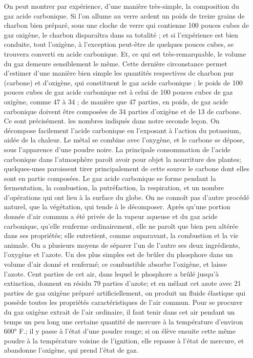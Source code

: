 On peut montrer par expérience, d'une manière très-simple, la composition du gaz acide carbonique. Si l'on allume au verre ardent un poids de treize grains de charbon bien préparé, sous une cloche de verre qui contienne 100 pouces cubes de gaz oxigène, le charbon disparaîtra dans sa totalité ; et si l'expérience est bien conduite, tout l'oxigène, à l'exception peut-être de quelques pouces cubes, se trouvera converti en acide carbonique. Et, ce qui est très-remarquable, le volume du gaz demeure sensiblement le même. Cette dernière circonstance permet d'estimer d'une manière bien simple les quantités respectives de charbon pur (carbone) et d'oxigène, qui constituent le gaz acide carbonique ; le poids de 100 pouces cubes de gaz acide carbonique est à celui de 100 pouces cubes de gaz oxigène, comme 47 à 34 ; de manière que 47 parties, en poids, de gaz acide carbonique doivent être composées de 34 parties d'oxigène et de 13 de carbone. Ce sont précisément.\setcounter{page}{10} les nombres indiqués dans notre seconde leçon.
On décompose facilement l'acide carbonique en l'exposant à l'action du potassium, aidée de la chaleur. Le métal se combine avec l'oxygène, et le carbone se dépose, sous l'apparence d'une poudre noire.
La principale consommation de l'acide carbonique dans l'atmosphère paroît avoir pour objet la nourriture des plantes; quelques-unes paroissent tirer principalement de cette source le carbone dont elles sont en partie composées.
Le gaz acide carbonique se forme pendant la fermentation, la combustion, la putréfaction, la respiration, et un nombre d'opérations qui ont lieu à la surface du globe. On ne connoît pas d'autre procédé naturel, que la végétation, qui tende à le décomposer.
Après qu'une portion donnée d'air commun a été privée de la vapeur aqueuse et du gaz acide carbonique, qu'elle renferme ordinairement, elle ne paroît que bien peu altérée dans ses propriétés; elle entretient, comme auparavant, la combustion et la vie animale. On a plusieurs moyens de séparer l'un de l'autre ses deux ingrédients, l'oxygène et l'azote. Un des plus simples est de\setcounter{page}{11} brûler du phosphore dans un volume d'air donné et renfermé; ce combustible absorbe l'oxigène, et laisse l'azote. Cent parties de cet air, dans lequel le phosphore a brûlé jusqu'à extinction, donnent en résidu 79 parties d'azote; et en mêlant cet azote avec 21 parties de gaz oxigène préparé artificiellement, on produit un fluide élastique qui possède toutes les propriétés caractéristiques de l'air commun. Pour se procurer du gaz oxigène extrait de l'air ordinaire, il faut tenir dans cet air pendant un temps un peu long une certaine quantité de mercure à la température d'environ 600° F.; il y passe à l'état d'une poudre rouge; si on élève ensuite cette même poudre à la température voisine de l'ignition, elle repasse à l'état de mercure, et abandonne l'oxigène, qui prend l'état de gaz.
